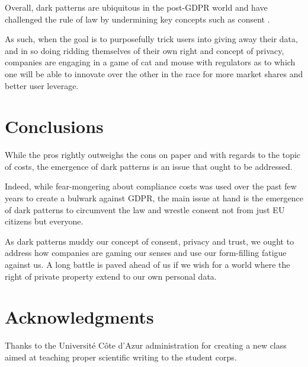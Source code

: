 \documentclass[runningheads]{llncs}
\begin{document}
Overall, dark patterns are ubiquitous in the post-GDPR world \cite{ref9} and have challenged the rule of law by undermining key concepts such as consent \cite{ref10}. 

As such, when the goal is to purposefully trick users into giving away their data, and in so doing ridding themselves of their own right and concept of privacy, companies are engaging in a game of cat and mouse with regulators as to which one will be able to innovate over the other in the race for more market shares and better user leverage.

\section{Conclusions}
While the pros rightly outweighs the cons on paper and with regards to the topic of costs, the emergence of dark patterns is an issue that ought to be addressed. 

Indeed, while fear-mongering about compliance costs was used over the past few years to create a bulwark against GDPR, the main issue at hand is the emergence of dark patterns to circumvent the law and wrestle consent not from just EU citizens but everyone. 

As dark patterns muddy our concept of consent, privacy and trust, we ought to address how companies are gaming our senses and use our form-filling fatigue against us. A long battle is paved ahead of us if we wish for a world where the right of private property extend to our own personal data.

\section{Acknowledgments}
Thanks to the Université Côte d'Azur administration for creating a new class aimed at teaching proper scientific writing to the student corps.
%

%
\end{document}
